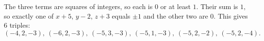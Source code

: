 The three terms are squares of integers, so each is $0$ or at least $1$. Their sum is $1$, so exactly one of $x+5$, $y-2$, $z+3$ equals $\pm1$ and the other two are $0$. This gives $6$ triples:
\[
\boxed{(-4,2,-3),\ (-6,2,-3),\ (-5,3,-3),\ (-5,1,-3),\ (-5,2,-2),\ (-5,2,-4)}.
\]
